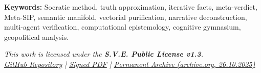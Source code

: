 \documentclass[11pt,a4paper]{article}
\begin{document}
\noindent\textbf{Keywords:} Socratic method, truth approximation, iterative facts, meta-verdict, Meta-SIP, semantic manifold, vectorial purification, narrative deconstruction, multi-agent verification, computational epistemology, cognitive gymnasium, geopolitical analysis.

\vspace{1em}
\begin{center}
\begin{minipage}{0.85\textwidth}
\centering
\itshape\small
This work is licensed under the \textbf{S.V.E. Public License v1.3}.\\[0.3em]
\href{https://codeberg.org/skovnats/SVE-Systemic-Verification-Engineering/tree/master/License/signed}{GitHub Repository}
\quad|\quad
\href{https://codeberg.org/skovnats/SVE-Systemic-Verification-Engineering/src/branch/master/License/signed/_SVE-Systemic-Verification-Engineering_License_SIGNED.pdf}{Signed PDF}
\quad|\quad
\href{https://archive.org/details/sve_public_license_v1.3}{Permanent Archive (archive.org, 26.10.2025)}
\end{minipage}
\end{center}
\vspace{1em}


\clearpage
\tableofcontents
\clearpage
\setcounter{page}{1}

\clearpage
\thispagestyle{empty}

\end{document}
